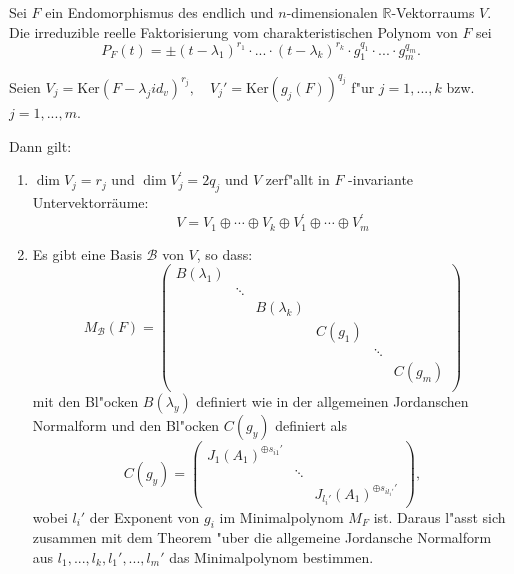 \documentclass[9pt, a4paper, twocolumn, landscape]{article}
\newcommand{\comment}[1]{}
\begin{document}
\begin{theorem}
Sei $F$ ein Endomorphismus des endlich und $n$-dimensionalen $\mathbb{R}$-Vektorraums $V$. Die irreduzible reelle Faktorisierung vom charakteristischen Polynom von $F$ sei
$$
P_F(t) = \pm (t- \lambda_1)^{r_1} \cdot ... \cdot (t- \lambda_k)^{r_k} \cdot g_1^{q_1} \cdot ... \cdot g_m^{q_m}.
$$ 

Seien
$V_j = \mathrm{Ker}(F- \lambda_j id_v)^{r_j}, \quad V_j' = \mathrm{Ker}(g_j(F))^{q_j}$ f"ur $j = 1, ..., k$ bzw. $j = 1, ..., m$. 
\comment{
Sei 
$$
d_{j r}= \operatorname{dim} \operatorname{Ker}\left(F-\lambda_{j} i d_{V}\right)^{r}, \quad 
d_{j r}^{\prime}=\operatorname{dim} \operatorname{Ker}\left(g_{j}(F)^{r}\right)
$$
f"ur $r = 1, 2, ...$, und setze formal $d_{jr} = d_{jr}' = 0$ f"ur $r \leq 0$. 
}
Dann gilt:
\begin{enumerate}
\item \(\operatorname{dim} V_{j}=r_{j}\) und \(\operatorname{dim} V_{j}^{\prime}=2 q_{j}\) und \(V\) zerf"allt in $F$ -invariante Untervektorräume:
$$
V=V_{1} \oplus \cdots \oplus V_{k} \oplus V_{1}^{\prime} \oplus \cdots \oplus V_{m}^{\prime}
$$
\item Es gibt eine Basis $\mathcal{B}$ von $V$, so dass:
$$
M_\mathcal{B}(F) = \left( \begin{array}{cccccc}B(\lambda_1) & & & & & \\
& \ddots & & & & \\
& & B(\lambda_k) & & & \\
& & & C(g_1) & & \\
& & & & \ddots & \\
& & & & & C(g_m) \\
\end{array}\right)
$$
mit den Bl"ocken $B(\lambda_y)$ definiert wie in der allgemeinen Jordanschen Normalform und den Bl"ocken $C(g_y)$ definiert als 
$$
C(g_y) = \left( \begin{array}{ccc}
J_1(A_1)^{\oplus s_{i1}'}  & & \\
& \ddots & \\
& & J_{l_i'}(A_1)^{\oplus s_{il_i'}'}
\end{array} \right), 
$$
wobei $l_i'$ der Exponent von $g_i$ im Minimalpolynom $M_F$ ist. Daraus l"asst sich zusammen mit dem Theorem "uber die allgemeine Jordansche Normalform aus $l_1, ..., l_k, l_1', ..., l_m'$ das Minimalpolynom bestimmen.
\comment{
$$
M_\mathcal{B}(F)=
\left(\begin{array}{cccc}J_{1}\left(\lambda_{1}\right)^{\oplus s_{11}} & & & \\ 

\end{array}$$}
\end{enumerate}
\end{theorem}
\end{document}
